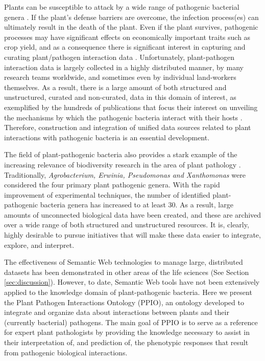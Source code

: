 \documentclass[sw]{iosart2c}
\begin{document}
Plants can be susceptible to attack by a wide range of pathogenic bacterial genera \cite{Bull2010}. If the plant's defense barriers are overcome, the infection process(es) can ultimately result in the death of the plant. Even if the plant survives, pathogenic processes may have significant effects on economically important traits such as crop yield, and as a consequence there is significant interest in capturing and curating plant/pathogen interaction data \cite{Montesinos}. Unfortunately, plant-pathogen interaction data is largely collected in a highly distributed manner, by many research teams worldwide, and sometimes even by individual land-workers themselves.  As a result, there is a large amount of both structured and unstructured, curated and non-curated, data in this domain of interest, as exemplified by the hundreds of publications that focus their interest on unveiling the mechanisms  by which the pathogenic bacteria interact with their hosts \cite{DeWit,Dodds}. Therefore, construction and integration of unified data sources related to plant interactions with pathogenic bacteria is an essential development. %

The field of plant-pathogenic bacteria also provides a stark example of the increasing relevance of biodiversity research in the area of plant pathology \cite{Mansfield}. Traditionally, {\itshape Agrobacterium, Erwinia, Pseudomonas and Xanthomonas} were considered the four primary plant pathogenic genera. With the rapid improvement of experimental techniques, the number of identified plant-pathogenic bacteria genera has increased to at least 30. As a result, large amounts of unconnected biological data have been created, and these are archived over a wide range of both structured and unstructured resources. It is, clearly, highly desirable to pursue initiatives that will make these data easier to integrate, explore, and interpret.

The effectiveness of Semantic Web technologies to manage large, distributed datasets has been demonstrated in other areas of the life sciences (See Section \ref{sec:discussion}). However, to date, Semantic Web tools have not been extensively applied to the knowledge domain of plant-pathogenic bacteria. Here we present the Plant Pathogen Interactions Ontology (PPIO), an ontology developed to integrate and organize data about interactions between plants and their (currently bacterial) pathogens. The main goal of PPIO is to serve as a reference for expert plant pathologists by providing the knowledge necessary to assist in their interpretation of, and prediction of, the phenotypic responses that result from pathogenic biological interactions.
\end{document}

